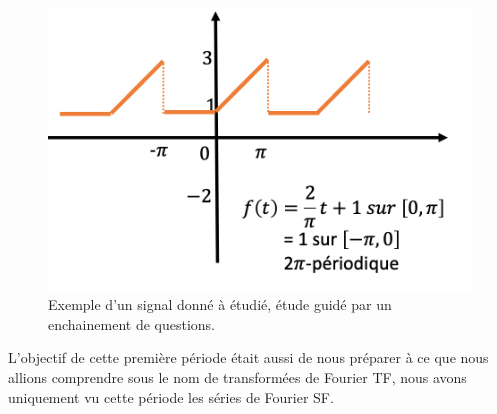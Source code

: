 \begin{figure}[H]
    \centering
    \includegraphics[width=\textwidth - \textwidth / 3]{ressources/r314/01.png}
    \caption{Exemple d'un signal donné à étudié, étude guidé par un enchainement de questions.}
    \label{fig:r314-01}
\end{figure}

L'objectif de cette première période était aussi de nous préparer à ce que nous allions comprendre sous le nom de transformées de Fourier TF, nous avons uniquement vu cette période les séries de Fourier SF.